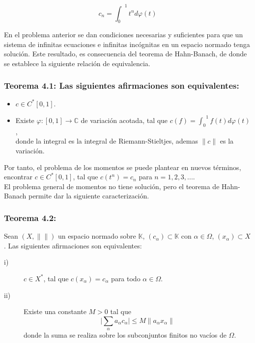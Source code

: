 \documentclass[10pt]{amsart}
\theoremstyle{remark}
\numberwithin{equation}{section}
\begin{document}
\[ c_n = {\int_0}^1 t^n d\varphi(t) \]

En el problema anterior se dan condiciones necesarias y suficientes para que un sistema de infinitas ecuaciones e infinitas incógnitas en un espacio normado tenga solución. Este resultado, es consecuencia del teorema de Hahn-Banach, de donde se establece la siguiente relación de equivalencia.
\subsubsection*{\textbf{Teorema 4.1:} Las siguientes afirmaciones son equivalentes:} 

\begin{itemize} 
\item $c \in C^{*}[0, 1]$.
\item Existe $\varphi: [0, 1] \to \mathbb{C}$ de variación acotada, tal que $c(f) = {\int_0}^1 f(t) d \varphi(t)$,\\
donde la integral es la integral de Riemann-Stieltjes, ademas $\lVert c \lVert$ es la variación.\\
\end{itemize}
Por tanto, el problema de los momentos se puede plantear en nuevos términos, encontrar $c \in C^{*}[0, 1]$, tal que $c(t^n) = c_n$
para $n=1, 2, 3, ...$.\\

 El problema general de momentos no tiene solución, pero el teorema de Hahn-Banach permite dar la siguiente caracterización.\\
\subsubsection*{\textbf{Teorema 4.2:}} Sean $(X, \lVert \rVert)$ un espacio normado sobre $\mathbb{K}$, $(c_\alpha) \subset \mathbb{K}$ con $\alpha \in \varOmega$, $(x_\alpha) \subset X$. Las siguientes afirmaciones son equivalentes:\\
\begin{description} 
\item[i)] $c \in X^{*}$, tal que $c(x_\alpha) = c_\alpha$ para todo $\alpha \in \varOmega$.
\item[ii)] Existe una constante $M>0$ tal que 
\[\mid \sum_\alpha a_\alpha c_\alpha \mid \leq M \lVert a_\alpha x_\alpha \rVert\] donde la suma se realiza sobre los subconjuntos finitos no vacíos de $\varOmega$.\\ 
\end{description}
\end{document}

